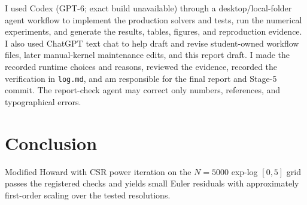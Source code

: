 \documentclass[11pt]{article}
\begin{document}
I used Codex (GPT-6; exact build unavailable) through a desktop/local-folder
agent workflow to implement the production solvers and tests, run the numerical
experiments, and generate the results, tables, figures, and reproduction
evidence. I also used ChatGPT text chat to help draft and revise student-owned
workflow files, later manual-kernel maintenance edits, and this report draft. I
made the recorded runtime choices and reasons, reviewed the evidence, recorded
the verification in \texttt{log.md}, and am responsible for the final report and
Stage-5 commit. The report-check agent may correct only numbers, references, and
typographical errors.

\section{Conclusion}

Modified Howard with CSR power iteration on the $N=5000$ exp-log $[0,5]$ grid
passes the registered checks and yields small Euler residuals with approximately
first-order scaling over the tested resolutions.
\end{document}
